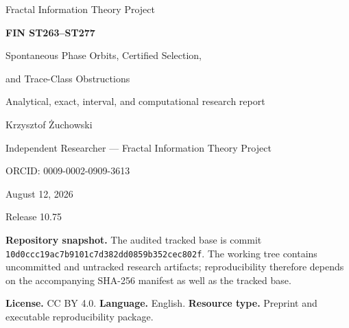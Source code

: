 \documentclass[11pt,a4paper]{article}
\begin{document}
\hypersetup{pageanchor=false}
\begin{titlepage}
\centering
\vspace*{1cm}
{\Large Fractal Information Theory Project\par}
\vspace{.9cm}
{\huge\bfseries FIN ST263--ST277\par}
\vspace{.4cm}
{\LARGE Spontaneous Phase Orbits, Certified Selection,\par}
{\LARGE and Trace-Class Obstructions\par}
\vspace{1cm}
{\large Analytical, exact, interval, and computational research report\par}
\vfill
{\Large Krzysztof \.{Z}uchowski\par}
\vspace{.2cm}
{\large Independent Researcher --- Fractal Information Theory Project\par}
{\large ORCID: 0009-0002-0909-3613\par}
\vspace{.8cm}
{\large August 12, 2026\par}
\vspace{.3cm}
{\large Release 10.75\par}
\vfill
\begin{minipage}{.92\textwidth}\small
\textbf{Repository snapshot.} The audited tracked base is commit
\texttt{10d0ccc19ac7b9101c7d382dd0859b352cec802f}. The working tree contains
uncommitted and untracked research artifacts; reproducibility therefore depends on the
accompanying SHA-256 manifest as well as the tracked base.

\medskip
\textbf{License.} CC BY 4.0. \quad \textbf{Language.} English. \quad
\textbf{Resource type.} Preprint and executable reproducibility package.
\end{minipage}
\end{titlepage}
\hypersetup{pageanchor=true}
\end{document}

